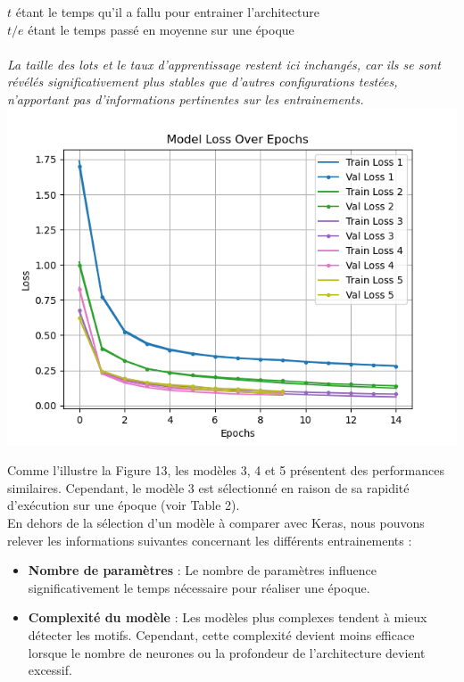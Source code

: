 \begin{multicols}{2}
{$t$ étant le temps qu'il a fallu pour entrainer l'architecture \\

$t/e$ étant le temps passé en moyenne sur une époque \\
} \\
\textit{La taille des lots et le taux d’apprentissage restent ici inchangés, car ils se sont révélés significativement plus stables 
que d'autres configurations testées, n'apportant pas d’informations pertinentes sur les entrainements.} \\


\includegraphics[width=\columnwidth]{images/mnist_losses.png}
\hfill\break

Comme l’illustre la Figure 13, les modèles 3, 4 et 5 présentent des performances similaires. 
Cependant, le modèle 3 est sélectionné en raison de sa rapidité d’exécution sur une 
époque (voir Table 2). \\

En dehors de la sélection d’un modèle à comparer avec Keras, nous pouvons relever les informations suivantes concernant les différents entrainements :
\begin{itemize}
\item \textbf{Nombre de paramètres} : Le nombre de paramètres influence significativement le temps nécessaire pour réaliser une époque.
\item \textbf{Complexité du modèle} : Les modèles plus complexes tendent à mieux détecter les motifs. Cependant, cette complexité devient moins efficace 
lorsque le nombre de neurones ou la profondeur de l’architecture devient excessif.
\end{itemize} 
\hfill\break


\end{multicols}
